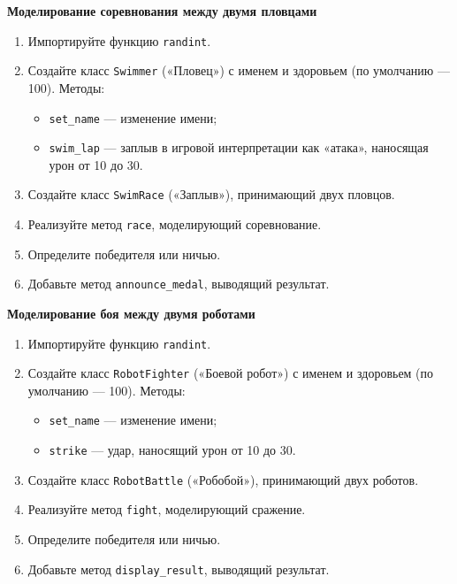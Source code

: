 \item \textbf{Моделирование соревнования между двумя пловцами}

\begin{enumerate}
    \item Импортируйте функцию \texttt{randint}.

    \item Создайте класс \texttt{Swimmer} («Пловец») с именем и здоровьем (по умолчанию — 100).  
    Методы:
    \begin{itemize}
        \item \texttt{set\_name} — изменение имени;
        \item \texttt{swim\_lap} — заплыв в игровой интерпретации как «атака», наносящая урон от 10 до 30.
    \end{itemize}

    \item Создайте класс \texttt{SwimRace} («Заплыв»), принимающий двух пловцов.

    \item Реализуйте метод \texttt{race}, моделирующий соревнование.

    \item Определите победителя или ничью.

    \item Добавьте метод \texttt{announce\_medal}, выводящий результат.
\end{enumerate}

\item \textbf{Моделирование боя между двумя роботами}

\begin{enumerate}
    \item Импортируйте функцию \texttt{randint}.

    \item Создайте класс \texttt{RobotFighter} («Боевой робот») с именем и здоровьем (по умолчанию — 100).  
    Методы:
    \begin{itemize}
        \item \texttt{set\_name} — изменение имени;
        \item \texttt{strike} — удар, наносящий урон от 10 до 30.
    \end{itemize}

    \item Создайте класс \texttt{RobotBattle} («Робобой»), принимающий двух роботов.

    \item Реализуйте метод \texttt{fight}, моделирующий сражение.

    \item Определите победителя или ничью.

    \item Добавьте метод \texttt{display\_result}, выводящий результат.
\end{enumerate}

